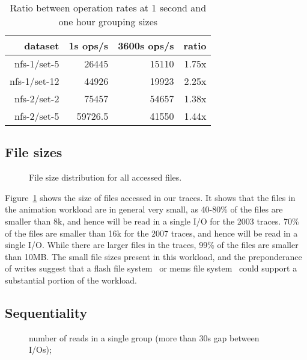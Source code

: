 \begin{table}
\begin{tabular}{|r|r|r|r|}
\hline
dataset & 1s ops/s & 3600s ops/s & ratio \\
\hline
nfs-1/set-5  & 26445  & 15110 & 1.75x \\
nfs-1/set-12 & 44926 & 19923 & 2.25x \\
nfs-2/set-2  & 75457 & 54657 & 1.38x \\
nfs-2/set-5  & 59726.5 & 41550 & 1.44x \\
\hline
\end{tabular}
\caption{Ratio between operation rates at 1 second and one hour grouping sizes}
\label{table:99quant-differences}
\end{table}

\subsection{File sizes}

\begin{figure}
\caption{File size distribution for all accessed files.}
\label{fig:file-size}
\end{figure}

Figure~\ref{fig:file-size} shows the size of files accessed in our
traces.  It shows that the files in the animation workload are in
general very small, as 40-80\% of the files are smaller than 8k, and
hence will be read in a single I/O for the 2003 traces.  70\% of the
files are smaller than 16k for the 2007 traces, and hence will be read
in a single I/O.  While there are larger files in the traces, 99\% of
the files are smaller than 10MB.  The small file sizes present in this
workload, and the preponderance of writes suggest that a flash file
system~\cite{Kawaguchi95aflash-memory} or mems file
system~\cite{SchlosserFast04} could support a substantial portion of
the workload.

\subsection{Sequentiality}

\begin{figure*}
\caption{number of reads in a single group (more than 30s gap between I/Os); }
\label{fig:seq-analysis}
\end{figure*}

